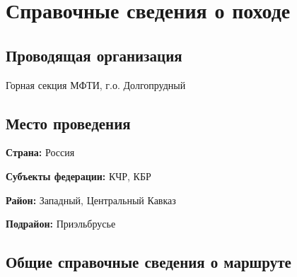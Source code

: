 \section{Справочные сведения о походе} 
\subsection{Проводящая организация}
Горная секция МФТИ, г.о. Долгопрудный


\subsection{Место проведения}
\textbf{Страна:} Россия

\textbf{Субъекты федерации:} КЧР, КБР

\textbf{Район:} Западный, Центральный Кавказ

\textbf{Подрайон:} Приэльбрусье


\subsection{Общие справочные сведения о маршруте}

